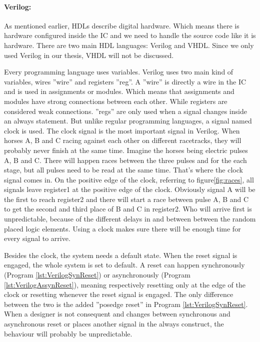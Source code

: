 \documentclass[12pt,a4paper,english,twoside,openright]{tutthesis}
\begin{document}
				\paragraph{Verilog:} \label{par:Verilog}
As mentioned earlier, HDLs describe digital hardware. Which means there is hardware configured inside the IC and we need to handle the source code like it is hardware. There are two main HDL languages: Verilog and VHDL. Since we only used Verilog in our thesis, VHDL will not be discussed.

Every programming language uses variables. Verilog uses two main kind of variables, wires ''wire'' and registers ''reg''. A ''wire'' is directly a wire in the IC and is used in assignments or modules. Which means that assignments and modules have strong connections between each other. While registers are considered weak connections. ''regs'' are only used when a signal changes inside an always statement. But unlike regular programming languages, a signal named clock is used. The clock signal is the most important signal in Verilog. When horses A, B and C racing against each other on different racetracks, they will probably never finish at the same time. Imagine the horses being electric pulses A, B and C. There will happen races between the three pulses and for the each stage, but all pulses need to be read at the same time. That's where the clock signal comes in. On the positive edge of the clock, referring to figure\ref{fig:races}, all signals leave register1 at the positive edge of the clock. Obviously signal A will be the first to reach register2 and there will start a race between pulse A, B and C to get the second and third place of B and C in register2. Who will arrive first is unpredictable, because of the different delays in and between between the random placed logic elements. Using a clock makes sure there will be enough time for every signal to arrive.

Besides the clock, the system needs a default state. When the reset signal is engaged, the whole system is set to default. A reset can happen synchronously (Program \ref{lst:VerilogSynReset}) or asynchronously (Program \ref{lst:VerilogAssynReset}), meaning respectively resetting only at the edge of the clock or resetting whenever the reset signal is engaged. The only difference between the two is the added ''posedge reset'' in Program \ref{lst:VerilogSynReset}. When a designer is not consequent and changes between synchronous and asynchronous reset or places another signal in the always construct, the behaviour will probably be unpredictable.
\end{document}
